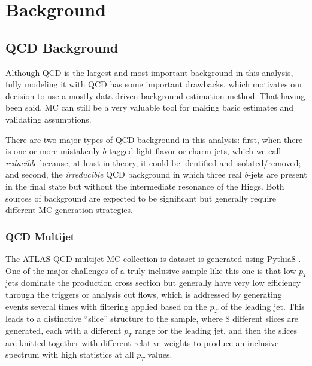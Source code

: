 \section{Background}
\subsection{QCD Background}
Although QCD is the largest and most important background in this analysis, fully modeling 
it with QCD has some important drawbacks, which motivates our decision to use a 
mostly data-driven background estimation method.  That having been said, MC can 
still be a very valuable tool for making basic estimates and validating assumptions. 

There are two major types of QCD background in this analysis: first, when 
there is one or more mistakenly $b$-tagged light flavor or charm jets, 
which we call \textit{reducible} because, at least in theory, 
it could be identified and isolated/removed; and second, the \textit{irreducible} 
QCD background in which three real $b$-jets are present in the final 
state but without the intermediate resonance of the Higgs.  Both sources of background are 
expected to be significant but generally require different MC generation strategies.



\subsubsection{QCD Multijet}
The ATLAS QCD multijet MC collection is dataset is generated using Pythia8 \cite{Pythia8}.  
One of the major challenges of a truly inclusive sample like this one is that 
low-$p_T$ jets dominate the production cross section but generally have 
very low efficiency through the triggers or analysis cut flows, which is addressed by 
generating events several times with filtering applied based on the $p_T$ 
of the leading jet.  This leads to a distinctive ``slice'' structure to 
the sample, where 8 different slices are generated, each with a different $p_T$ 
range for the leading jet, and then the slices are knitted together with different 
relative weights to produce an inclusive spectrum with high statistics at all $p_T$ values.  

